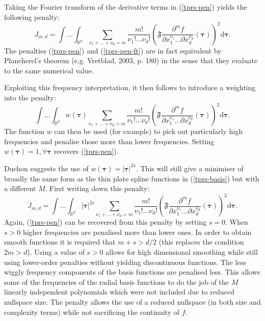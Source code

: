 \documentclass[useAMS, referee]{biom}
\begin{document}
Taking the Fourier transform of the derivative terms in (\ref{tprs-pen}) yields the following penalty:
\begin{equation}
J_{m,d} = \int \ldots \int_{\mathbb{R}^d} \sum_{\nu_1 + \dots + \nu_d=m} \frac{m!}{\nu_1! \dots \nu_d!} \left ( \mathfrak{F} \frac{\partial^m f}{\partial x_1^{\nu_1} \ldots  \partial x_d^{\nu_d}} \left (  \boldsymbol{\tau}\right ) \right )^2 \text{d} \boldsymbol{\tau}.
\label{tprs-pen-ft}
\end{equation}
The penalties (\ref{tprs-pen}) and (\ref{tprs-pen-ft}) are in fact equivalent by Plancherel's theorem (e.g. Vretblad, 2003, p. 180) in the sense that they evaluate to the same numerical value.

Exploiting this frequency interpretation, it then follows to introduce a weighting into the penalty: 
\begin{equation}
\int \ldots \int_{\mathbb{R}^d} w(\boldsymbol{\tau}) \sum_{\nu_1 + \dots + \nu_d=m} \frac{m!}{\nu_1! \dots \nu_d!} \left ( \mathfrak{F} \frac{\partial^m f}{\partial x_1^{\nu_1} \ldots  \partial x_d^{\nu_d}} \left (\boldsymbol{\tau} \right ) \right )^2 \text{d} \boldsymbol{\tau}.
\label{duchon-penalty-general}
\end{equation}
The function $w$ can then be used (for example) to pick out particularly high frequencies and penalise those more than lower frequencies. Setting $w(\boldsymbol{\tau})=1, \forall \boldsymbol{\tau}$ recovers (\ref{tprs-pen}).

Duchon suggests the use of $w(\boldsymbol{\tau})= \lvert \boldsymbol{\tau} \rvert^{2s}$. This will still give a minimiser of broadly the same form as the thin plate spline functions in (\ref{tprs-basis}) but with a different $M$. First writing down this penalty:
\begin{equation}
\breve{J}_{m,d} = \int \ldots \int_{\mathbb{R}^d} \lvert \boldsymbol{\tau} \rvert^{2s} \sum_{\nu_1 + \dots + \nu_d=m} \frac{m!}{\nu_1! \dots \nu_d!}\left ( \mathfrak{F} \frac{\partial^m f}{\partial x_1^{\nu_1} \ldots  \partial x_d^{\nu_d}} \left (\boldsymbol{\tau} \right ) \right )^2 \text{d} \boldsymbol{\tau}.
\label{duchon-penalty}
\end{equation}
Again, (\ref{tprs-pen}) can be recovered from this penalty by setting $s=0$. When $s>0$ higher frequencies are penalised more than lower ones. In order to obtain smooth functions it is required that $m+s>d/2$ (this replaces the condition $2m>d$). Using a value of $s>0$ allows for high dimensional smoothing while still using lower-order penalties without yielding discontinuous functions. The less wiggly frequency components of the basis functions are penalised less. This allows some of the frequencies of  the radial basis functions to do the job of the $M$ linearly independent polynomials which were not included due to reduced nullspace size. The penalty allows the use of a reduced nullspace (in both size and complexity terms) while not sacrificing the continuity of $f$. 
\end{document}
